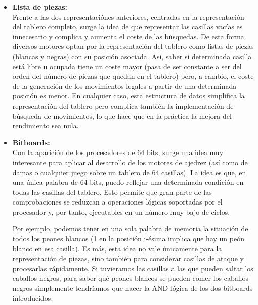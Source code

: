 \documentclass[letterpaper,12pt]{article}
\begin{document}
\begin{itemize}
    \item \textbf{Lista de piezas:} \\
    Frente a las dos representaciónes anteriores, centradas en la representación del 
    tablero completo, surge la idea de que representar las casillas vacías es innecesario
    y complica y aumenta el coste de las búsquedas. De esta forma diversos motores optan
    por la representación del tablero como listas de piezas (blancas y negras) con su
    posición asociada. Así, saber si determinada casilla está libre u ocupada tiene un
    coste mayor (pasa de ser constante a ser del orden del número de piezas que quedan
    en el tablero) pero, a cambio, el coste de la generación de los movimientos legales a
    partir de una determinada posición es menor. En cualquier caso, esta estructura de
    datos simplifica la representación del tablero pero complica también la implementación
    de búsqueda de movimientos, lo que hace que en la práctica la mejora del rendimiento
    sea nula.
    
    \item \textbf{Bitboards:} \\
    Con la aparición de los procesadores de 64 bits, surge una idea muy interesante para
    aplicar al desarrollo de los motores de ajedrez (así como de damas o cualquier juego 
    sobre un tablero de 64 casillas). La idea es que, en una única palabra de 64 bits, 
    puedo reflejar una determinada condición en todas las casillas del tablero. Esto 
    permite que gran parte de las comprobaciones se reduzcan a operaciones lógicas 
    soportadas por el procesador y, por tanto, ejecutables en un número muy bajo de ciclos.
    
    Por ejemplo, podemos tener en una sola palabra de memoria la situación de todos los
    peones blancos (1 en la posición i-ésima implica que hay un peón blanco en esa 
    casilla). Es más, esta idea no vale únicamente para la representación de piezas, sino
    también para considerar casillas de ataque y procesarlas rápidamente. Si tuvieramos
    las casillas a las que pueden saltar los caballos negros, para saber qué peones blancos
    se pueden comer los caballos negros simplemente tendríamos que hacer la AND lógica
    de los dos bitboards introducidos.
    
\end{itemize}
    
\end{document}
